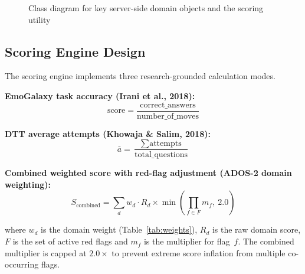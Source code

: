 \documentclass[12pt,a4paper,oneside]{report}
\begin{document}
\begin{figure}[b]
{}
  \caption{Class diagram for key server-side domain objects and the scoring utility}
  \label{fig:classdiag}
\end{figure}

\clearpage
\subsection{Scoring Engine Design}

The scoring engine implements three research-grounded calculation modes.

\textbf{EmoGalaxy task accuracy (Irani et al., 2018):}
\begin{equation}
  \text{score} = \frac{\text{correct\_answers}}{\text{number\_of\_moves}}
\end{equation}

\textbf{DTT average attempts (Khowaja \& Salim, 2018):}
\begin{equation}
  \bar{a} = \frac{\sum \text{attempts}}{\text{total\_questions}}
\end{equation}

\textbf{Combined weighted score with red-flag adjustment (ADOS-2 domain weighting):}
\begin{equation}
  S_{\text{combined}} = \sum_{d} w_d \cdot R_d \times \min\!\left(\prod_{f \in F} m_f,\ 2.0\right)
\end{equation}

where $w_d$ is the domain weight (Table~\ref{tab:weights}), $R_d$ is the raw domain score, $F$ is the set of active red flags and $m_f$ is the multiplier for flag~$f$. The combined multiplier is capped at $2.0\times$ to prevent extreme score inflation from multiple co-occurring flags.
\end{document}

